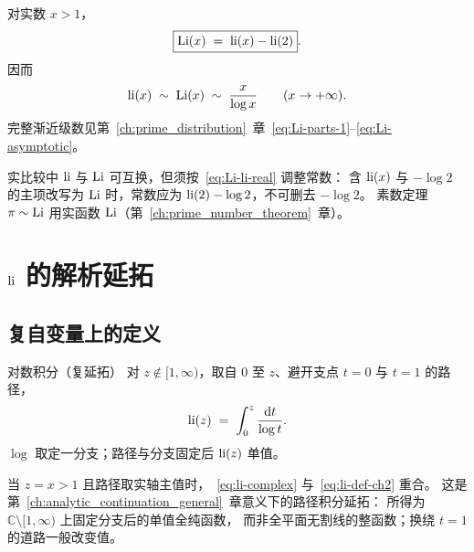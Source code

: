 对实数 $x>1$，
\begin{equation}
  \boxed{
  \operatorname{Li}(x)
  \;=\;
  \operatorname{li}(x)-\operatorname{li}(2)
  }.
  \label{eq:Li-li-real}
\end{equation}
因而
\begin{equation}
  \operatorname{li}(x)\;\sim\;\operatorname{Li}(x)\;\sim\;\frac{x}{\log x}
  \qquad(x\to+\infty).
  \label{eq:li-Li-asymp}
\end{equation}
完整渐近级数见第~\ref{ch:prime_distribution}~章~\eqref{eq:Li-parts-1}--\eqref{eq:Li-asymptotic}。

实比较中 \(\operatorname{li}\) 与 \(\operatorname{Li}\) 可互换，但须按~\eqref{eq:Li-li-real} 调整常数：
含 $\operatorname{li}(x)$ 与 $-\log 2$ 的主项改写为 $\operatorname{Li}$ 时，常数应为 $\operatorname{li}(2)-\log 2$，不可删去 $-\log 2$。
素数定理 $\pi\sim\operatorname{Li}$ 用实函数 $\operatorname{Li}$（第~\ref{ch:prime_number_theorem}~章）。

\section{\texorpdfstring{$\operatorname{li}$}{li} 的解析延拓}
\label{sec:li-complex-power}

\subsection{复自变量上的定义}

\begin{definition}{对数积分（复延拓）}{}
\label{def:li-complex}
对 $z\notin[1,\infty)$，取自 $0$ 至 $z$、避开支点 $t=0$ 与 $t=1$ 的路径，
\begin{equation}
  \operatorname{li}(z)
  \;=\;
  \int_{0}^{z}\frac{\mathrm{d}t}{\log t}.
  \label{eq:li-complex}
\end{equation}
$\log$ 取定一分支；路径与分支固定后 $\operatorname{li}(z)$ 单值。
\end{definition}

当 $z=x>1$ 且路径取实轴主值时，~\eqref{eq:li-complex} 与~\eqref{eq:li-def-ch2} 重合。
这是第~\ref{ch:analytic_continuation_general}~章意义下的路径积分延拓：
所得为 $\mathbb{C}\setminus[1,\infty)$ 上固定分支后的单值全纯函数，
而非全平面无割线的整函数；换绕 $t=1$ 的道路一般改变值。

